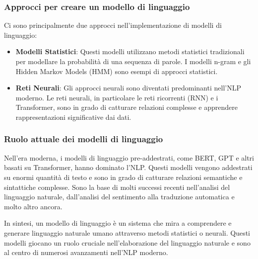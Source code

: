 \subsubsection{Approcci per creare un modello di linguaggio}
Ci sono principalmente due approcci nell'implementazione di modelli di linguaggio:

\begin{itemize}
    \item \textbf{Modelli Statistici}: Questi modelli utilizzano metodi statistici tradizionali per modellare la probabilità di una sequenza di parole. I modelli n-gram e gli Hidden Markov Models (HMM) sono esempi di approcci statistici.
    \item \textbf{Reti Neurali}: Gli approcci neurali sono diventati predominanti nell'NLP moderno. Le reti neurali, in particolare le reti ricorrenti (RNN) e i Transformer, sono in grado di catturare relazioni complesse e apprendere rappresentazioni significative dai dati.

\end{itemize}


\subsubsection{Ruolo attuale dei modelli di linguaggio}
Nell'era moderna, i modelli di linguaggio pre-addestrati, come BERT, GPT e altri basati su Transformer, hanno dominato l'NLP. Questi modelli vengono addestrati su enormi quantità di testo e sono in grado di catturare relazioni semantiche e sintattiche complesse. Sono la base di molti successi recenti nell'analisi del linguaggio naturale, dall'analisi del sentimento alla traduzione automatica e molto altro ancora.

In sintesi, un modello di linguaggio è un sistema che mira a comprendere e generare linguaggio naturale umano attraverso metodi statistici o neurali. Questi modelli giocano un ruolo cruciale nell'elaborazione del linguaggio naturale e sono al centro di numerosi avanzamenti nell'NLP moderno.